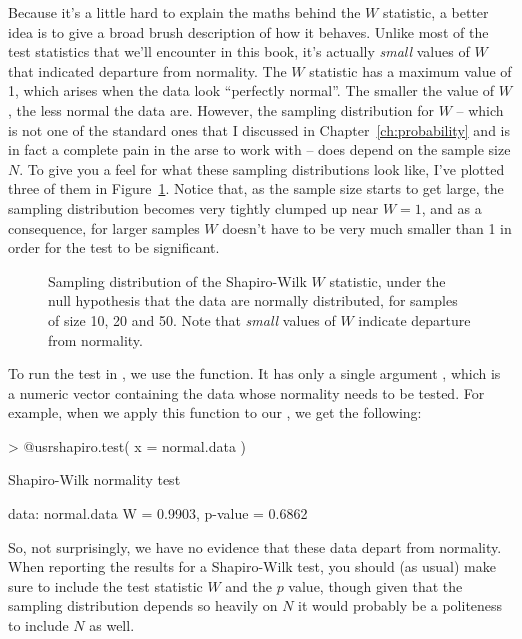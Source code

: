 Because it's a little hard to explain the maths behind the $W$ statistic, a better idea is to give a broad brush description of how it behaves. Unlike most of the test statistics that we'll encounter in this book, it's actually {\it small} values of $W$ that indicated departure from normality. The $W$ statistic has a maximum value of 1, which arises when the data look ``perfectly normal''. The smaller the value of $W$, the less normal the data are. However, the sampling distribution for $W$  -- which is not one of the standard ones that I discussed in Chapter~\ref{ch:probability} and is in fact a complete pain in the arse to work with -- does depend on the sample size $N$. To give you a feel for what these sampling distributions look like, I've plotted three of them in Figure~\ref{fig:swdist}. Notice that, as the sample size starts to get large, the sampling distribution becomes very tightly clumped up near $W=1$, and as a consequence, for larger samples $W$ doesn't have to be very much smaller than 1 in order for the test to be significant. 

\begin{figure}
\begin{center}
\caption{Sampling distribution of the Shapiro-Wilk $W$ statistic, under the null hypothesis that the data are normally distributed, for samples of size 10, 20 and 50. Note that {\it small} values of $W$ indicate departure from normality.}
\HR
\label{fig:swdist}
\end{center}
\end{figure}

To run the test in \R, we use the  function. It has only a single argument , which is a numeric vector containing the data whose normality needs to be tested. For example, when we apply this function to  our , we get the following:
\begin{rblock1}
> @usr{shapiro.test( x = normal.data )}

	Shapiro-Wilk normality test

data:  normal.data 
W = 0.9903, p-value = 0.6862
\end{rblock1}
So, not surprisingly, we have no evidence that these data depart from normality. When reporting the results for a Shapiro-Wilk test, you should (as usual) make sure to include the test statistic $W$ and the $p$ value, though given that the sampling distribution depends so heavily on $N$ it would probably be a politeness to include $N$ as well.


